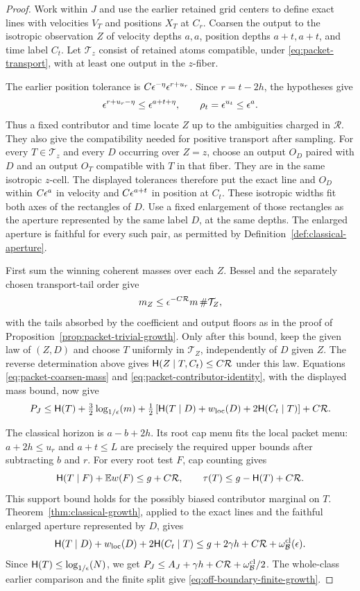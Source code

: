 \begin{proof}
Work within \(J\) and use the earlier retained grid centers to define
exact lines with velocities \(V_T\) and positions \(X_T\) at \(C_r\).
Coarsen the output to the isotropic observation \(Z\) of velocity
depths \(a,a\), position depths \(a+t,a+t\), and time label \(C_t\).
Let \(\mathcal T_z\) consist of retained atoms compatible, under
\eqref{eq:packet-transport}, with at least one output in the \(z\)-fiber.

The earlier position tolerance is
\(C\epsilon^{-\eta}\epsilon^{r+u_r}\).  Since \(r=t-2h\), the hypotheses give
\[
 \epsilon^{r+u_r-\eta}\le\epsilon^{a+t+\eta},
 \qquad \rho_t=\epsilon^{u_t}\le\epsilon^a.
\]
Thus a fixed contributor and time locate \(Z\) up to the ambiguities
charged in \(\mathcal R\).  They also give the compatibility needed
for positive transport after sampling.  For every
\(T\in\mathcal T_z\) and every \(D\) occurring over \(Z=z\), choose
an output \(O_D\) paired with \(D\) and an output \(O_T\) compatible
with \(T\) in that fiber.  They are in the same isotropic \(z\)-cell.
The displayed tolerances therefore put the exact line and \(O_D\)
within \(C\epsilon^a\) in velocity and
\(C\epsilon^{a+t}\) in position at \(C_t\).  These isotropic widths fit
both axes of the rectangles of \(D\).  Use a fixed enlargement of
those rectangles as the aperture represented by the same label \(D\),
at the same depths.
The enlarged aperture is faithful for every such pair, as permitted
by Definition~\ref{def:classical-aperture}.

First sum the winning coherent masses over each \(Z\).  Bessel and
the separately chosen transport-tail order give
\[
 m_Z\le\epsilon^{-C\mathcal R}m\,\#\mathcal T_Z,
\]
with the tails absorbed by the coefficient and output floors as in
the proof of Proposition~\ref{prop:packet-trivial-growth}.
Only after this bound, keep the given law of \((Z,D)\) and choose
\(T\) uniformly in \(\mathcal T_Z\), independently of \(D\) given
\(Z\).  The reverse determination above gives
\(\mathsf H(Z\mid T,C_t)\le C\mathcal R\) under this law.
Equations \eqref{eq:packet-coarsen-mass} and
\eqref{eq:packet-contributor-identity}, with the displayed mass
bound, now give
\[
 P_J\le\mathsf H(T)+\tfrac32\log_{1/\epsilon}\!\left(m\right)+
 \tfrac12\left[
    \mathsf H(T\mid D)+w_{\rm loc}(D)+2\mathsf H(C_t\mid T)
 \right]+C\mathcal R.
\]

The classical horizon is \(a-b+2h\).  Its root cap menu fits the
local packet menu: \(a+2h\le u_r\) and \(a+t\le L\) are precisely
the required upper bounds after subtracting \(b\) and \(r\).
For every root test \(F\), cap counting gives
\[
 \mathsf H(T\mid F)+\mathbb E w(F)\le g+C\mathcal R,
 \qquad \tau(T)\le g-\mathsf H(T)+C\mathcal R.
\]
This support bound holds for the possibly biased contributor marginal
on \(T\).  Theorem~\ref{thm:classical-growth}, applied to the exact
lines and the faithful enlarged aperture represented by \(D\), gives
\[
 \mathsf H(T\mid D)+w_{\rm loc}(D)+2\mathsf H(C_t\mid T)
 \le g+2\gamma h+C\mathcal R+
                       \omega^{\rm cl}_{\mathcal B}(\epsilon).
\]
Since \(\mathsf H(T)\le\log_{1/\epsilon}\!\left(N\right)\), we get
\(P_J\le A_J+\gamma h+C\mathcal R+
\omega^{\rm cl}_{\mathcal B}/2\).
The whole-class earlier comparison and the finite split give
\eqref{eq:off-boundary-finite-growth}.


\end{proof}
